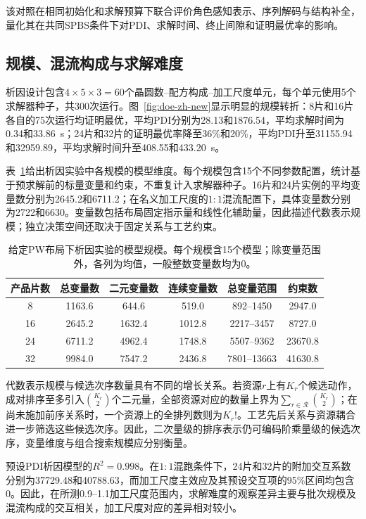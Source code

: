 \documentclass[final,5p,times,twocolumn]{elsarticle}
\begin{document}
该对照在相同初始化和求解预算下联合评价角色感知表示、序列解码与结构补全，量化其在共同SPBS条件下对PDI、求解时间、终止间隙和证明最优率的影响。

\subsection{规模、混流构成与求解难度}

析因设计包含$4\times5\times3=60$个晶圆数--配方构成--加工尺度单元，每个单元使用5个求解器种子，共300次运行。图~\ref{fig:doe-zh-new}显示明显的规模转折：8片和16片各自的75次运行均证明最优，平均PDI分别为28.13和1876.54，平均求解时间为0.34和33.86~s；24片和32片的证明最优率降至36\%和20\%，平均PDI升至31155.94和32959.89，平均求解时间升至408.55和433.20~s。


表~\ref{tab:model-scale-cn}给出析因实验中各规模的模型维度。每个规模包含15个不同参数配置，统计基于预求解前的标量变量和约束，不重复计入求解器种子。16片和24片实例的平均变量数分别为2645.2和6711.2；在名义加工尺度的$1{:}1$混流配置下，具体变量数分别为2722和6630。变量数包括布局固定指示量和线性化辅助量，因此描述代数表示规模；独立决策空间还取决于固定关系与工艺约束。

\begin{table}[t]
\centering
\small
\setlength{\tabcolsep}{5pt}
\caption{给定PW布局下析因实验的模型规模。每个规模含15个模型；除变量范围外，各列为均值，一般整数变量数均为0。}
\label{tab:model-scale-cn}
\begin{tabular}{cccccc}
\toprule
产品片数 & 总变量数 & 二元变量数 & 连续变量数 & 总变量范围 & 约束数\\
\midrule
8 & 1163.6 & 644.6 & 519.0 & 892--1450 & 2947.0\\
16 & 2645.2 & 1632.4 & 1012.8 & 2217--3457 & 8727.0\\
24 & 6711.2 & 4962.4 & 1748.8 & 5507--9362 & 23670.8\\
32 & 9984.0 & 7547.2 & 2436.8 & 7801--13663 & 41630.8\\
\bottomrule
\end{tabular}
\end{table}

代数表示规模与候选次序数量具有不同的增长关系。若资源$r$上有$K_r$个候选动作，成对排序至多引入$\binom{K_r}{2}$个二元量，全部资源对应的数量上界为$\sum_{r\in\mathcal R}\binom{K_r}{2}$；在尚未施加前序关系时，一个资源上的全排列数则为$K_r!$。工艺先后关系与资源耦合进一步筛选这些候选次序。因此，二次量级的排序表示仍可编码阶乘量级的候选次序，变量维度与组合搜索规模应分别衡量。

预设PDI析因模型的$R^2=0.998$。在$1{:}1$混跑条件下，24片和32片的附加交互系数分别为37729.48和40788.63，而加工尺度主效应及其预设交互项的95\%区间均包含0。因此，在所测0.9--1.1加工尺度范围内，求解难度的观察差异主要与批次规模及混流构成的交互相关，加工尺度对应的差异相对较小。
\end{document}
